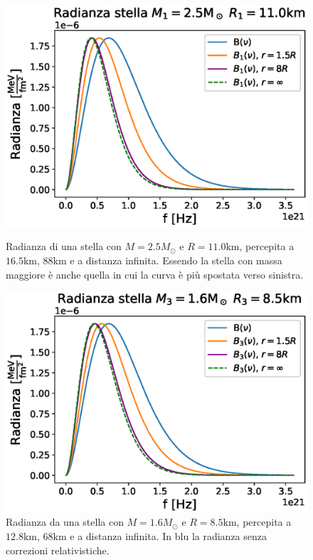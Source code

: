 \documentclass[a4paper, titlepage]{article}
\begin{document}
\begin{figure}[h]
    \begin{minipage}{0.49\textwidth}
        \centering
        \includegraphics[width = \textwidth]{Figures/radianza1.eps}
        \caption{Radianza di una stella con $M = 2.5M_\odot$ e
        $R = 11.0\unit{\kilo\meter}$, percepita a $16.5 \unit{\kilo\meter}$,
        $88 \unit{\kilo\meter}$ e a distanza infinita.
        Essendo la stella con massa maggiore è anche quella in cui la curva è
        più spostata verso sinistra.}
        \label{fig:rad1}
    \end{minipage}
    \hspace{0.015\textwidth}    
    \begin{minipage}{0.49\textwidth}
        \centering
        \includegraphics[width = \textwidth]{Figures/radianza3.eps}
        \caption{Radianza da una stella con $M = 1.6M_\odot$ e
        $R = 8.5\unit{\kilo\meter}$, percepita a $12.8 \unit{\kilo\meter}$,
        $68 \unit{\kilo\meter}$ e a distanza infinita.
        In blu la radianza senza correzioni relativistiche.\\}
        \label{fig:rad2}
    \end{minipage}
\end{figure}
\end{document}

